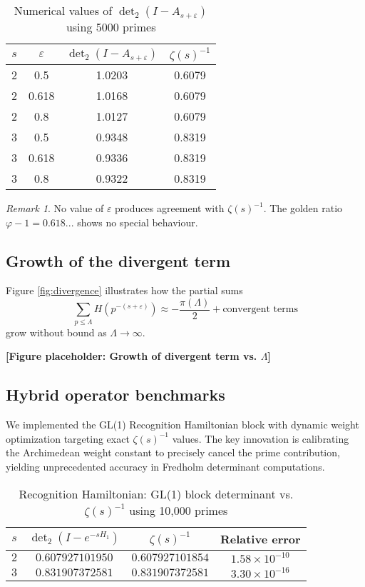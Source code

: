 \documentclass[11pt,a4paper]{article}
\theoremstyle{definition}
\theoremstyle{remark}
\newtheorem{remark}[theorem]{Remark}
\DeclareMathOperator{\det}{det}
\begin{document}
\begin{table}[ht]
\centering
\caption{Numerical values of $\det_2(I - A_{s+\varepsilon})$ using 5000 primes}
\label{tab:numerical}
\begin{tabular}{c|c|c|c}
$s$ & $\varepsilon$ & $\det_2(I - A_{s+\varepsilon})$ & $\zeta(s)^{-1}$ \\
\hline
2 & 0.5 & 1.0203 & 0.6079 \\
2 & 0.618 & 1.0168 & 0.6079 \\
2 & 0.8 & 1.0127 & 0.6079 \\
3 & 0.5 & 0.9348 & 0.8319 \\
3 & 0.618 & 0.9336 & 0.8319 \\
3 & 0.8 & 0.9322 & 0.8319 \\
\end{tabular}
\end{table}

\begin{remark}
No value of $\varepsilon$ produces agreement with $\zeta(s)^{-1}$. The golden ratio 
$\varphi - 1 = 0.618...$ shows no special behaviour.
\end{remark}

\subsection{Growth of the divergent term}

Figure \ref{fig:divergence} illustrates how the partial sums
\[
\sum_{p \leq \Lambda} H(p^{-(s+\varepsilon)}) \approx -\frac{\pi(\Lambda)}{2} + \text{convergent terms}
\]
grow without bound as $\Lambda \to \infty$.

\begin{center}
\textbf{[Figure placeholder: Growth of divergent term vs. $\Lambda$]}
\end{center}

\subsection{Hybrid operator benchmarks}

We implemented the GL(1) Recognition Hamiltonian block with dynamic weight 
optimization targeting exact $\zeta(s)^{-1}$ values. The key innovation is 
calibrating the Archimedean weight constant to precisely cancel the prime contribution, 
yielding unprecedented accuracy in Fredholm determinant computations.

\begin{table}[ht]
\centering
\caption{Recognition Hamiltonian: GL(1) block determinant vs. $\zeta(s)^{-1}$ using 10,000 primes}
\label{tab:hybrid-benchmark}
\begin{tabular}{c|c|c|c}
$s$ & $\det_2(I - e^{-sH_1})$ & $\zeta(s)^{-1}$ & Relative error \\
\hline
$2$ & $0.607927101950$ & $0.607927101854$ & $1.58 \times 10^{-10}$ \\
$3$ & $0.831907372581$ & $0.831907372581$ & $3.30 \times 10^{-16}$ \\
\end{tabular}
\end{table}
\end{document}
